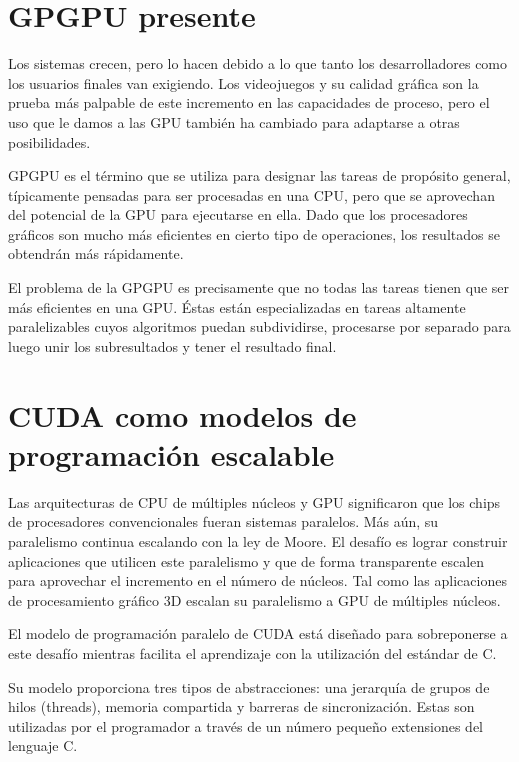 \documentclass[a4paper,openright,12pt, oneside]{book}
\begin{document}
\section{GPGPU presente}

Los sistemas crecen, pero lo hacen debido a lo que tanto los desarrolladores como los usuarios finales van exigiendo. Los videojuegos y su calidad gr\'afica son la prueba m\'as palpable de este incremento en las capacidades de proceso, pero el uso que le damos a las GPU tambi\'en ha cambiado para adaptarse a otras posibilidades.

GPGPU es el t\'ermino que se utiliza para designar las tareas de prop\'osito general, t\'ipicamente pensadas para ser procesadas en una CPU, pero que se aprovechan del potencial de la GPU para ejecutarse en ella. Dado que los procesadores gr\'aficos son mucho m\'as eficientes en cierto tipo de operaciones, los resultados se obtendr\'an m\'as r\'apidamente.

El problema de la GPGPU es precisamente que no todas las tareas tienen que ser m\'as eficientes en una GPU. \'Estas est\'an especializadas en tareas altamente paralelizables cuyos algoritmos puedan subdividirse, procesarse por separado para luego unir los subresultados y tener el resultado final.


\section{CUDA como modelos de programaci\'on escalable}

Las arquitecturas de CPU de m\'ultiples n\'ucleos y GPU significaron que los chips 
de procesadores convencionales fueran sistemas paralelos. M\'as a\'un, su paralelismo
continua escalando con la ley de Moore. El desaf\'io es lograr construir aplicaciones
que utilicen este paralelismo y que de forma transparente escalen para aprovechar
el incremento en el n\'umero de n\'ucleos. Tal como las aplicaciones de procesamiento
gr\'afico 3D escalan su paralelismo a GPU de m\'ultiples n\'ucleos.

El modelo de programaci\'on paralelo de CUDA est\'a dise\~nado para sobreponerse a este
desaf\'io mientras facilita el aprendizaje con la utilizaci\'on del est\'andar de C.

Su modelo proporciona tres tipos de abstracciones: una jerarqu\'ia de grupos de hilos (threads),
memoria compartida y barreras de sincronizaci\'on. Estas son utilizadas por el programador
a trav\'es de un n\'umero peque\~no extensiones del lenguaje C.
\end{document}
